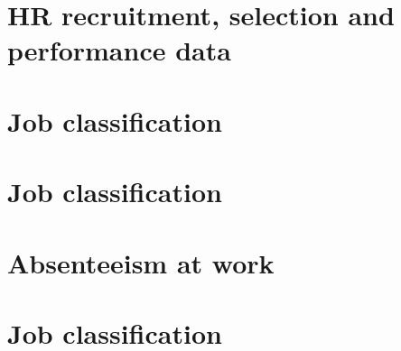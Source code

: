 \documentclass[12pt, krantz2,]{krantz}
\begin{document}
\hypertarget{HRrecruitment}{%
\section{HR recruitment, selection and performance data}\label{HRrecruitment}}

\hypertarget{job-classification}{%
\section{Job classification}\label{job-classification}}

\hypertarget{job-classification-1}{%
\section{Job classification}\label{job-classification-1}}

\hypertarget{absenteeism-at-work}{%
\section{Absenteeism at work}\label{absenteeism-at-work}}

\hypertarget{job-classification-2}{%
\section{Job classification}\label{job-classification-2}}



\backmatter
\printindex
\end{document}
